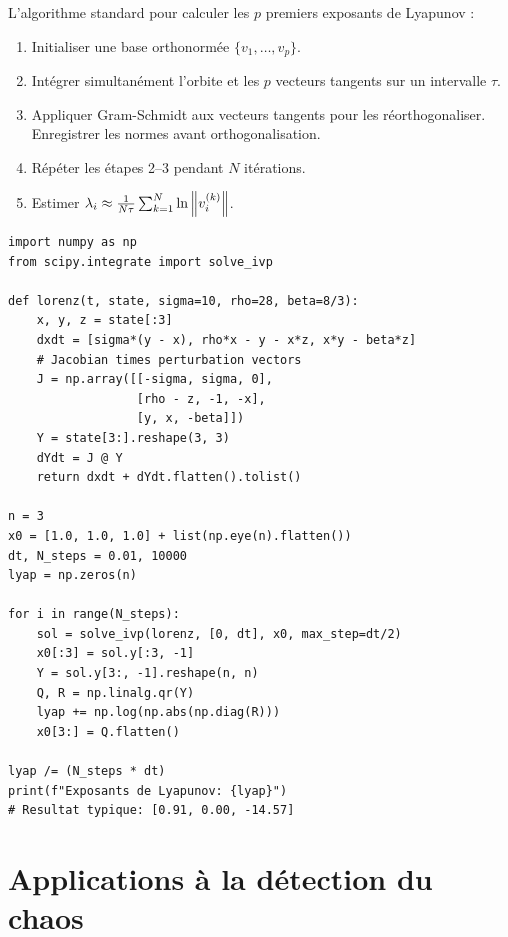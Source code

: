 \begin{definition}
L'algorithme standard pour calculer les $p$ premiers exposants de Lyapunov :
\begin{enumerate}
    \item Initialiser une base orthonorm\'ee $\{v_1, \ldots, v_p\}$.
    \item Int\'egrer simultan\'ement l'orbite et les $p$ vecteurs tangents
    sur un intervalle $\tau$.
    \item Appliquer Gram-Schmidt aux vecteurs tangents pour les
    r\'eorthogonaliser. Enregistrer les normes avant orthogonalisation.
    \item R\'ep\'eter les \'etapes 2--3 pendant $N$ it\'erations.
    \item Estimer $\lambda_i \approx \frac{1}{N\tau}\sum_{k=1}^{N} \ln \left\| v_i^{(k)} \right\|$.
\end{enumerate}
\end{definition}

\begin{codeblock}[title=\textbf{Calcul des exposants de Lyapunov du syst\`eme de Lorenz}]
\begin{verbatim}
import numpy as np
from scipy.integrate import solve_ivp

def lorenz(t, state, sigma=10, rho=28, beta=8/3):
    x, y, z = state[:3]
    dxdt = [sigma*(y - x), rho*x - y - x*z, x*y - beta*z]
    # Jacobian times perturbation vectors
    J = np.array([[-sigma, sigma, 0],
                  [rho - z, -1, -x],
                  [y, x, -beta]])
    Y = state[3:].reshape(3, 3)
    dYdt = J @ Y
    return dxdt + dYdt.flatten().tolist()

n = 3
x0 = [1.0, 1.0, 1.0] + list(np.eye(n).flatten())
dt, N_steps = 0.01, 10000
lyap = np.zeros(n)

for i in range(N_steps):
    sol = solve_ivp(lorenz, [0, dt], x0, max_step=dt/2)
    x0[:3] = sol.y[:3, -1]
    Y = sol.y[3:, -1].reshape(n, n)
    Q, R = np.linalg.qr(Y)
    lyap += np.log(np.abs(np.diag(R)))
    x0[3:] = Q.flatten()

lyap /= (N_steps * dt)
print(f"Exposants de Lyapunov: {lyap}")
# Resultat typique: [0.91, 0.00, -14.57]
\end{verbatim}
\end{codeblock}

\section{Applications \`a la d\'etection du chaos}

